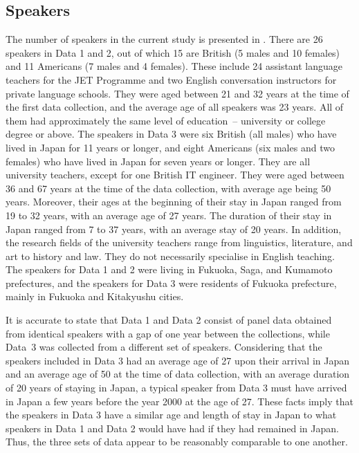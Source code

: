 \documentclass[output=paper,colorlinks,citecolor=brown]{langscibook}
\begin{document}
\subsection{Speakers} %
\label{sec:hirano:4.2}

The number of speakers in the current study is presented in . There are 26 speakers in Data 1 and 2, out of which 15 are British (5 males and 10 females) and 11 Americans (7 males and 4 females). These include 24 assistant language teachers for the JET Programme and two English conversation instructors for private language schools. They were aged between 21 and 32 years at the time of the first data collection, and the average age of all speakers was 23 years. All of them had approximately the same level of education~– university or college degree or above. The speakers in Data 3 were six British (all males) who have lived in Japan for 11 years or longer, and eight Americans (six males and two females) who have lived in Japan for seven years or longer. They are all university teachers, except for one British IT engineer. They were aged between 36 and 67 years at the time of the data collection, with average age being 50 years. Moreover, their ages at the beginning of their stay in Japan ranged from 19 to 32 years, with an average age of 27 years. The duration of their stay in Japan ranged from 7 to 37 years, with an average stay of 20 years. In addition, the research fields of the university teachers range from linguistics, literature, and art to history and law. They do not necessarily specialise in English teaching. The speakers for Data 1 and 2 were living in Fukuoka, Saga, and Kumamoto prefectures, and the speakers for Data 3 were residents of Fukuoka prefecture, mainly in Fukuoka and Kitakyushu cities.

It is accurate to state that Data 1 and Data 2 consist of panel data obtained from identical speakers with a gap of one year between the collections, while Data~3 was collected from a different set of speakers. Considering that the speakers included in Data 3 had an average age of 27 upon their arrival in Japan and an average age of 50 at the time of data collection, with an average duration of 20 years of staying in Japan, a typical speaker from Data 3 must have arrived in Japan a few years before the year 2000 at the age of 27. These facts imply that the speakers in Data 3 have a similar age and length of stay in Japan to what speakers in Data 1 and Data 2 would have had if they had remained in Japan. Thus, the three sets of data appear to be reasonably comparable to one another.
\end{document}
